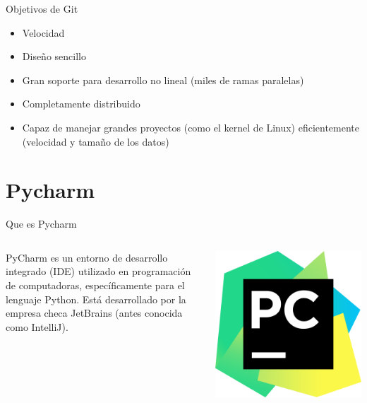 \begin{frame}[c]{Objetivos de Git}
    \begin{itemize}
        \item Velocidad
        \item Diseño sencillo
        \item Gran soporte para desarrollo no lineal (miles de ramas paralelas)
        \item Completamente distribuido
        \item Capaz de manejar grandes proyectos (como el kernel de Linux)
            eficientemente (velocidad y tamaño de los datos)
    \end{itemize}
\end{frame}

\section{Pycharm}

\begin{frame}[c]{Que es Pycharm}
    \begin{columns}
        PyCharm es un entorno de desarrollo integrado (IDE) utilizado en
        programación de computadoras, específicamente para el lenguaje Python.
        Está desarrollado por la empresa checa JetBrains (antes conocida como
        IntelliJ).
        \begin{center}
            \includegraphics[scale=0.1]{img/pycharm-logo.png}
        \end{center}
    \end{columns}
\end{frame}

